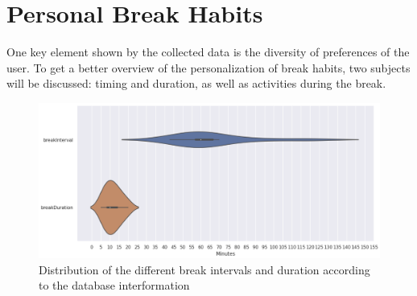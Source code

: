 \documentclass{hasel_thesis}
\begin{document}
\section{Personal Break Habits}

One key element shown by the collected data is the diversity of preferences of the user. To get a better overview of the personalization of break habits, two subjects will be discussed: timing and duration, as well as activities during the break.


\begin{figure}[htp]
    \centering
    \includegraphics[width=14cm]{hasel_thesis/images/break_Interval_Duration.png}
    \caption{Distribution of the different break intervals and duration according to the database interformation}
    \label{fig:interval_duration}
\end{figure}
\end{document}
